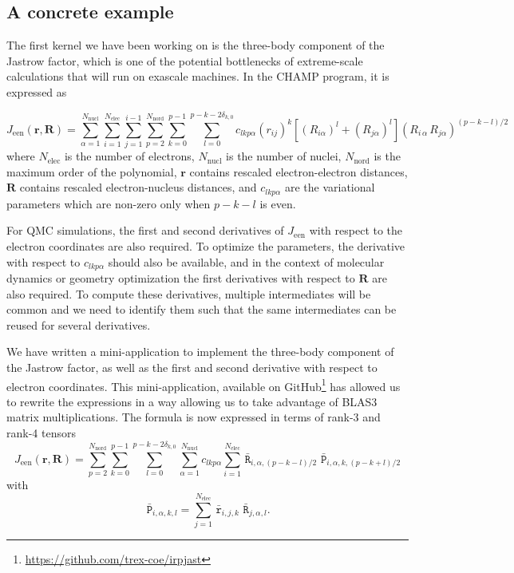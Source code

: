 \subsection{A concrete example}

The first kernel we have been working on is the three-body component of
the Jastrow factor, which is one of the potential bottlenecks of
extreme-scale calculations that will run on exascale machines.
In the CHAMP program, it is expressed as

\newcommand{\Jeen}{J_{\text{een}}}
\newcommand{\Nel}{N_{\text{elec}}}
\newcommand{\Nat}{N_{\text{nucl}}}
\newcommand{\Nord}{N_{\text{nord}}}
\newcommand{\lmax}{p-k-2\delta_{k,0}}
\newcommand{\br}{\mathbf{r}}
\newcommand{\bR}{\mathbf{R}}
\[
  \Jeen (\br,\bR) = \sum_{\alpha=1}^{\Nat} \sum_{i=1}^{\Nel} \sum_{j=1}^{i-1}
\sum_{p=2}^{\Nord} \sum_{k=0}^{p-1}
\sum_{l=0}^{\lmax} c_{lkp\alpha}
\left( {r}_{ij} \right)^k
\left[ \left( {R}_{i\alpha} \right)^l + \left( {R}_{j\alpha} \right)^l \right]
\left( {R}_{i\,\alpha} \, {R}_{j\alpha} \right)^{(p-k-l)/2} 
\]
where
$\Nel$ is the number of electrons, 
$\Nat$ is the number of nuclei,
$\Nord$ is the maximum order of the polynomial, 
$\br$ contains rescaled electron-electron distances, 
$\bR$ contains rescaled electron-nucleus distances,
and $c_{lkp\alpha}$ are the variational parameters which are non-zero
only when $p-k-l$ is even.

For \ac{QMC} simulations, the first and second derivatives of $\Jeen$ with
respect to the electron coordinates are also required. To optimize the
parameters, the derivative with respect to $c_{lkp\alpha}$
should also be available, and in the context of molecular dynamics or
geometry optimization the first derivatives with respect to $\bR$ are
also required. To compute these derivatives, multiple intermediates
will be common and we need to identify them such that the same
intermediates can be reused for several derivatives.

We have written a mini-application to implement the three-body component
of the Jastrow factor, as well as the first and second derivative with
respect to electron coordinates. This mini-application, available on
GitHub\footnote{\url{https://github.com/trex-coe/irpjast}} has allowed us to
rewrite the expressions in a way allowing us to take advantage of BLAS3
matrix multiplications. The formula is now expressed in terms of
rank-3 and rank-4 tensors
\newcommand{\tr}{\, \bar{\mathtt{r}}}
\newcommand{\tR}{\, \bar{\mathtt{R}}}
\newcommand{\tP}{\, \bar{\mathtt{P}}}
\[
  \Jeen(\br,\bR) = 
  \sum_{p=2}^{\Nord}\sum_{k=0}^{p-1}
  \sum_{l=0}^{\lmax} 
    \sum_{\alpha=1}^{\Nat}
    c_{lkp\alpha}
    \sum_{i=1}^{\Nel}
    {\tR}_{i,\alpha,(p-k-l)/2}\,
  {\tP}_{i,\alpha,k,(p-k+l)/2}
  \]
with 
  \[
  {\tP}_{i, \alpha, k, l} = \sum_{j=1}^{\Nel} {\tr}_{i,j,k}\,{\tR}_{j,\alpha,l}.
  \]
  
